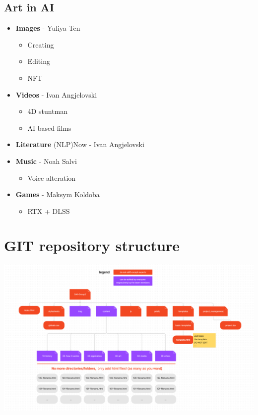 \documentclass[12pt]{article}
\begin{document}
 \subsection{Art in AI}
 \begin{itemize}[label=$\bullet$]
     \item \textbf{Images} - Yuliya Ten
      \begin{itemize}[label=$\circ$]
          \item Creating
          \item Editing
          \item NFT
      \end{itemize}
      \item \textbf{Videos} - Ivan Angjelovski
        \begin{itemize}[label=$\circ$]
          \item 4D stuntman
          \item AI based films
       \end{itemize}
      \item \textbf{Literature} (NLP)Now - Ivan Angjelovski
      \item \textbf{Music} - Noah Salvi
      \begin{itemize}[label=$\circ$]
          \item Voice alteration
      \end{itemize}
      \item \textbf{Games} - Maksym Koldoba
      \begin{itemize}[label=$\circ$]
          \item RTX + DLSS
      \end{itemize}
 \end{itemize}


\section{GIT repository structure}
\includegraphics[width=\linewidth]{GITRepStr.png}
\end{document}
